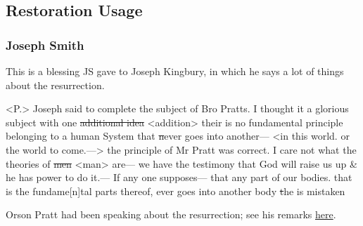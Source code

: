	

\subsection{Restoration Usage} %
	\label{RESURRECTION-RESTORATION}

	\subsubsection{Joseph Smith} %
		\label{RESURRECTION-JS}
	
		\begin{compactdesc}
			\item[{\hyperref[EMS-1843-JS-23-MAR-1843-JK]{23 March 1843}}] \phantom{.}
				\begin{compactitem}
					\item This is a blessing JS gave to Joseph Kingbury, in which he says a lot of things about the resurrection.
				\end{compactitem}
			\item[{\hyperlink{EMS-1843-JS-6-8-APR-1843-WR-i}{6--8 April 1843 WR-i}}] <P.> Joseph said to complete the subject of Bro Pratts. I thought it a glorious subject with one \sout{additional idea} <addition> their is no fundamental principle belonging to a human System that \sout{n}ever goes into another--- <in this world. or the world to come.---> the principle of Mr Pratt was correct. I care not what the theories of \sout{men} <man> are--- we have the testimony that God will raise us up \& he has power to do it.--- If any one supposes--- that any part of our bodies. that is the fundame[n]tal parts thereof, ever goes into another body \sout{t}he is mistaken
				\begin{compactitem}
					\item Orson Pratt had been speaking about the resurrection; see his remarks \hyperref[EMS-1843-OP-6-8-APR-1843-WR]{here}.
				\end{compactitem}
		\end{compactdesc}
		
